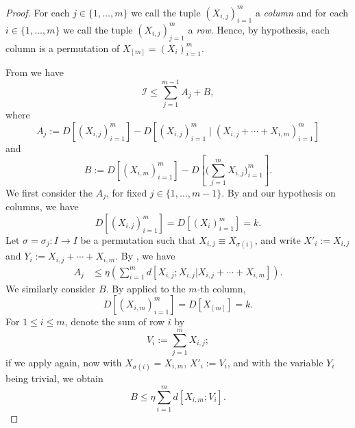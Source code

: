 \begin{proof}\leanok
  For each $j \in \{1,\dots,m\}$ we call the tuple $(X_{i,j})_{i = 1}^m$ a \emph{column} and for each $i \in \{1,\dots, m\}$ we call the tuple $(X_{i,j})_{j = 1}^m$ a \emph{row}. Hence, by hypothesis, each column is a permutation of $X_{[m]} = (X_i)_{i=1}^m$.

From  we have
\begin{equation}\label{441} {\mathcal I} \leq \sum_{j=1}^{m-1} A_j + B,\end{equation}
where
\[
  A_j := D[ (X_{i, j})_{i = 1}^m] - D[ (X_{i, j})_{i = 1}^m  \; \big| \; (X_{i,j} + \cdots + X_{i,m})_{i =1}^m  ]
\]
and
\[
  B := D[ (X_{i,m})_{i=1}^m ] - D[ \bigl(\sum_{j=1}^m X_{i,j}\bigr)_{i=1}^m ].
\]
We first consider the $A_j$, for fixed $j \in \{1,\dots, m-1\}$.
By  and our hypothesis on columns, we have
\[
  D[ (X_{i, j})_{i = 1}^m ]= D[ (X_i)_{i=1}^m ] = k.
\]
Let $\sigma = \sigma_j \colon I \to I$ be a permutation such that $X_{i,j} \equiv X_{\sigma(i)}$, and write $X'_i := X_{i,j}$ and $Y_i := X_{i,j} + \cdots + X_{i,m}$.
By , we have
\begin{align}
  A_j & \leq \eta (\sum_{i = 1}^{m} d[X_{i,j}; X_{i, j}|X_{i, j} + \cdots + X_{i,m}]).\label{54a}
\end{align}
We similarly consider $B$.  By  applied to the $m$-th column,
\[
  D[ (X_{i, m})_{i = 1}^m ] = D[X_{[m]}] = k.
\]
For $1 \leq i \leq m$, denote the sum of row $i$ by
\[
  V_i := \sum_{j=1}^m X_{i,j};
\]
if we apply  again, now with $X_{\sigma(i)} = X_{i,m}$, $X'_i := V_i$, and with the variable $Y_i$ being trivial, we obtain
\begin{equation}\label{55a}
  B \leq \eta \sum_{i = 1}^m d[X_{i,m}; V_i].
\end{equation}


\end{proof}
